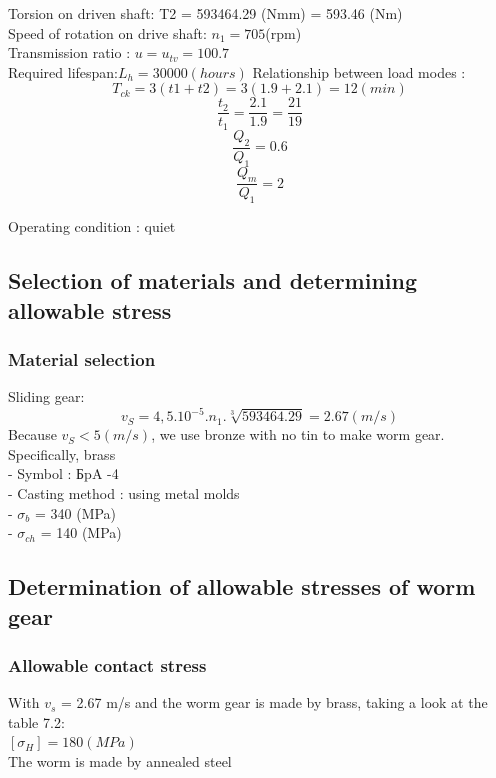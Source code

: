 	Torsion on driven shaft: T2 = 593464.29 (Nmm) = 593.46 (Nm)\\
	Speed of rotation on drive shaft: $n_1 = 705 $(rpm) \\
	Transmission ratio : $u=u_{tv} = 100.7 $ \\
	Required lifespan:$ L_h = 30000 (hours) $
	Relationship between load modes :
$$T_{ck} = 3(t1 + t2) = 3(1.9 + 2.1) = 12 (min)$$
$$\frac{t_2}{t_1}=\frac{2.1}{1.9}=\frac{21}{19}$$
$$\frac{Q_2}{Q_1}=0.6$$
$$\frac{Q_m}{Q_1}=2$$

 Operating condition : quiet  %

\subsection{Selection of materials and determining allowable stress }
\subsubsection{	Material selection}
Sliding gear:
$$	v_S={4,5.10}^{-5}.n_1.\sqrt[3]{593464.29} = 2.67 (m/s) $$ 
Because $v_S < 5(m/s)$, we use bronze with no tin to make worm gear. Specifically, brass \\
-	Symbol : \;\; $Б$pA \;-4\\
-	Casting method : using metal molds\\
-	$\sigma_b$ = 340 (MPa)    	\\	
-	$\sigma_{ch}$ = 140 (MPa)    



\subsection{Determination of allowable stresses of worm gear }

\subsubsection{Allowable contact stress }
With $v_s$ = 2.67 m/s and the worm gear is made by brass, taking a look at the table 7.2: \\
	$[\sigma_H ]= 180 (MPa)$\\
	The worm is made by annealed steel

